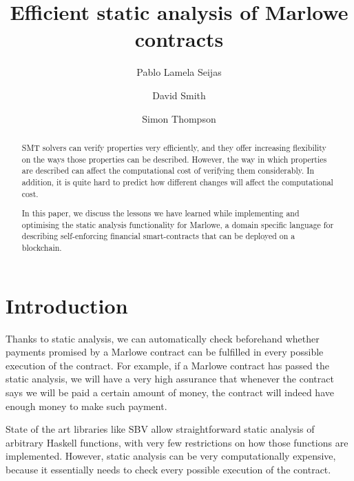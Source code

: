 \documentclass[english,runningheads]{llncs}
\begin{document}
\title{Efficient static analysis of Marlowe contracts}

\author{Pablo {Lamela Seijas} \and
        David Smith \and
        Simon Thompson}



\maketitle
\begin{abstract}
SMT solvers can verify properties very efficiently, and they offer increasing flexibility on the ways those properties can be described. However, the way in which properties are described can affect the computational cost of verifying them considerably. In addition, it is quite hard to predict how different changes will affect the computational cost.

In this paper, we discuss the lessons we have learned while implementing and optimising the static analysis functionality for Marlowe, a domain specific language for describing self-enforcing financial smart-contracts that can be deployed on a blockchain.
\end{abstract}
\section{Introduction\label{sec:Introduction}}

Thanks to static analysis, we can automatically check beforehand whether
payments promised by a Marlowe contract can be fulfilled in every
possible execution of the contract. For example, if a Marlowe contract
has passed the static analysis, we will have a very high assurance
that whenever the contract says we will be paid a certain amount of
money, the contract will indeed have enough money to make such payment.

State of the art libraries like SBV \cite{erkok2019sbv} allow straightforward
static analysis of arbitrary Haskell functions, with very few restrictions
on how those functions are implemented. However, static analysis can be very
computationally expensive, because it essentially needs to check every
possible execution of the contract.
\end{document}
